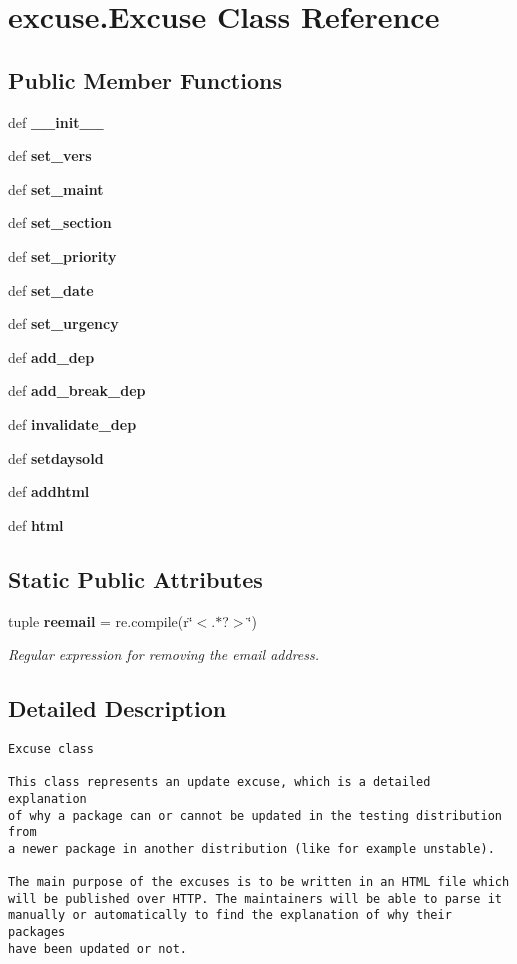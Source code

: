 \section{excuse.Excuse Class Reference}
\label{classexcuse_1_1Excuse}
\subsection*{Public Member Functions}
\begin{CompactItemize}
\item 
def {\bf \_\-\_\-init\_\-\_\-}
\item 
def {\bf set\_\-vers}
\item 
def {\bf set\_\-maint}
\item 
def {\bf set\_\-section}
\item 
def {\bf set\_\-priority}
\item 
def {\bf set\_\-date}
\item 
def {\bf set\_\-urgency}
\item 
def {\bf add\_\-dep}
\item 
def {\bf add\_\-break\_\-dep}
\item 
def {\bf invalidate\_\-dep}
\item 
def {\bf setdaysold}
\item 
def {\bf addhtml}
\item 
def {\bf html}
\end{CompactItemize}
\subsection*{Static Public Attributes}
\begin{CompactItemize}
\item 
tuple {\bf reemail} = re.compile(r\char`\"{}$<$.$\ast$?$>$\char`\"{})\label{classexcuse_1_1Excuse_bb15f55eed8f034db8a64b4ddc46460d}

\begin{CompactList}\small\item\em Regular expression for removing the email address. \item\end{CompactList}\end{CompactItemize}


\subsection{Detailed Description}


\footnotesize\begin{verbatim}Excuse class

This class represents an update excuse, which is a detailed explanation
of why a package can or cannot be updated in the testing distribution  from
a newer package in another distribution (like for example unstable).

The main purpose of the excuses is to be written in an HTML file which
will be published over HTTP. The maintainers will be able to parse it
manually or automatically to find the explanation of why their packages
have been updated or not.
\end{verbatim}
\normalsize
 



